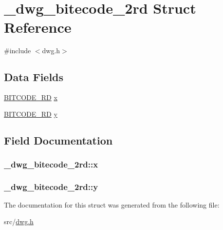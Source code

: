 \hypertarget{struct__dwg__bitecode__2rd}{\section{\-\_\-dwg\-\_\-bitecode\-\_\-2rd \-Struct \-Reference}
\label{struct__dwg__bitecode__2rd}
}


{\ttfamily \#include $<$dwg.\-h$>$}

\subsection*{\-Data \-Fields}
\begin{DoxyCompactItemize}
\item 
\hyperlink{dwg_8h_a309e7e59a4030a89943640d0d327cef7}{\-B\-I\-T\-C\-O\-D\-E\-\_\-\-R\-D} \hyperlink{struct__dwg__bitecode__2rd_a2018234438842248872f773f620321c5}{x}
\item 
\hyperlink{dwg_8h_a309e7e59a4030a89943640d0d327cef7}{\-B\-I\-T\-C\-O\-D\-E\-\_\-\-R\-D} \hyperlink{struct__dwg__bitecode__2rd_a277d9768e03360ff775818809dee4492}{y}
\end{DoxyCompactItemize}


\subsection{\-Field \-Documentation}
\hypertarget{struct__dwg__bitecode__2rd_a2018234438842248872f773f620321c5}{
\subsubsection[{x}]{ {\bf \-\_\-dwg\-\_\-bitecode\-\_\-2rd\-::x}}}\label{struct__dwg__bitecode__2rd_a2018234438842248872f773f620321c5}
\hypertarget{struct__dwg__bitecode__2rd_a277d9768e03360ff775818809dee4492}{
\subsubsection[{y}]{ {\bf \-\_\-dwg\-\_\-bitecode\-\_\-2rd\-::y}}}\label{struct__dwg__bitecode__2rd_a277d9768e03360ff775818809dee4492}


\-The documentation for this struct was generated from the following file\-:\begin{DoxyCompactItemize}
\item 
src/\hyperlink{dwg_8h}{dwg.\-h}\end{DoxyCompactItemize}
